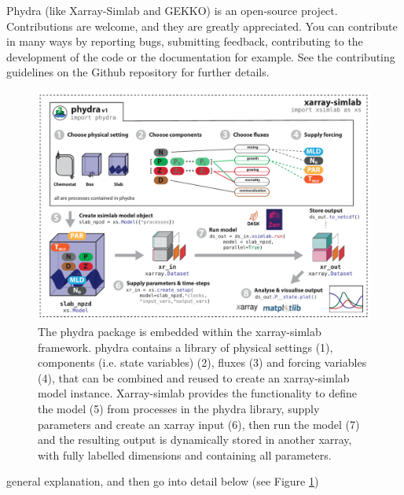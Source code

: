 \documentclass[template.tex]{subfiles}
\begin{document}
Phydra (like Xarray-Simlab and GEKKO) is an open-source project. Contributions are welcome, and they are greatly appreciated. You can contribute in many ways by reporting bugs, submitting feedback, contributing to the development of the code or the documentation for example. See the contributing guidelines on the Github repository for further details.







%
\begin{figure}[t]
\includegraphics[width=12cm]{Figures/firstdraft_schematics/01__schematics_phydra_1.pdf}
\caption{The phydra package is embedded within the xarray-simlab framework. phydra contains a library of physical settings (1), components (i.e. state variables) (2), fluxes (3) and forcing variables (4), that can be combined and reused to create an xarray-simlab model instance. Xarray-simlab provides the functionality to define the model (5) from processes in the phydra library, supply parameters and create an xarray input (6), then run the model (7) and the resulting output is dynamically stored in another xarray, with fully labelled dimensions and containing all parameters.}
\label{Figure:phydraschematics}
\end{figure}

general explanation, and then go into detail below (see Figure \ref{Figure:phydraschematics})





\biblio
\end{document}
